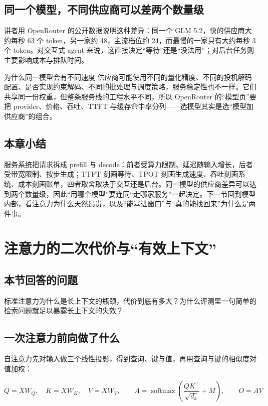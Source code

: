 \documentclass[a4paper]{article}
\begin{document}
\subsection{同一个模型，不同供应商可以差两个数量级}

讲者用 OpenRouter 的公开数据说明这种差异：同一个 GLM 5.2，快的供应商大约每秒 63 个 token，另一家约 48，主流档位约 24，而最慢的一家只有大约每秒 3 个 token。对交互式 agent 来说，这直接决定“等待”还是“没法用”；对后台任务则主要影响成本与排队时间。

\begin{knowledgebox}{为什么同一模型会有不同速度}
供应商可能使用不同的量化精度、不同的投机解码配置、是否实现约束解码、不同的批处理与调度策略，服务稳定性也不一样。它们共享同一份权重，但整条服务栈的工程水平不同，所以 OpenRouter 的“模型页”要把 provider、价格、吞吐、TTFT 与缓存命中率分列——选模型其实是选“模型加供应商”的组合。
\end{knowledgebox}

\subsection{本章小结}
服务系统把请求拆成 prefill 与 decode：前者受算力限制、延迟随输入增长，后者受带宽限制、按步生成；TTFT 刻画等待、TPOT 刻画生成速度、吞吐刻画系统、成本刻画账单，四者取舍取决于交互还是后台。同一模型的供应商差异可以达到两个数量级，因此“用哪个模型”要连同“走哪家服务”一起决定。下一节回到模型内部，看注意力为什么天然昂贵，以及“能塞进窗口”与“真的能找回来”为什么是两件事。

\section{注意力的二次代价与“有效上下文”}

\subsection*{本节回答的问题}
标准注意力为什么是长上下文的瓶颈，代价到底有多大？为什么评测里一句简单的检索问题就足以暴露长上下文的失效？

\subsection{一次注意力前向做了什么}

自注意力先对输入做三个线性投影，得到查询、键与值，再用查询与键的相似度对值加权：

\[
Q=XW_Q,\quad K=XW_K,\quad V=XW_V,\qquad
A=\operatorname{softmax}\!\left(\frac{QK^{\top}}{\sqrt{d_k}}+M\right),\qquad
O=AV
\]
\end{document}
